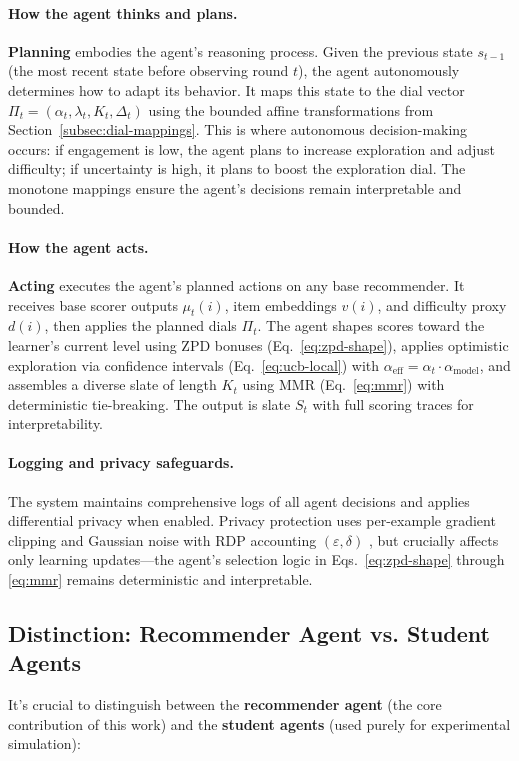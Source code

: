 \paragraph{How the agent thinks and plans.} \textbf{Planning} embodies the agent's reasoning process. Given the previous state \(s_{t-1}\) (the most recent state before observing round \(t\)), the agent autonomously determines how to adapt its behavior. It maps this state to the dial vector \(\Pi_t=(\alpha_t,\lambda_t,K_t,\Delta_t)\) using the bounded affine transformations from Section~\ref{subsec:dial-mappings}. This is where autonomous decision-making occurs: if engagement is low, the agent plans to increase exploration and adjust difficulty; if uncertainty is high, it plans to boost the exploration dial. The monotone mappings ensure the agent's decisions remain interpretable and bounded.

\paragraph{How the agent acts.} \textbf{Acting} executes the agent's planned actions on any base recommender. It receives base scorer outputs \(\mu_t(i)\), item embeddings \(v(i)\), and difficulty proxy \(d(i)\), then applies the planned dials \(\Pi_t\). The agent shapes scores toward the learner's current level using ZPD bonuses (Eq.~\eqref{eq:zpd-shape}), applies optimistic exploration via confidence intervals (Eq.~\eqref{eq:ucb-local}) with \(\alpha_{\mathrm{eff}}=\alpha_t\cdot\alpha_{\text{model}}\), and assembles a diverse slate of length \(K_t\) using MMR (Eq.~\eqref{eq:mmr}) with deterministic tie-breaking. The output is slate \(S_t\) with full scoring traces for interpretability.

\paragraph{Logging and privacy safeguards.} The system maintains comprehensive logs of all agent decisions and applies differential privacy when enabled. Privacy protection uses per-example gradient clipping and Gaussian noise with RDP accounting $(\varepsilon,\delta)$ \cite{Mironov2017RDP,Abadi2016}, but crucially affects only learning updates—the agent's selection logic in Eqs.~\eqref{eq:zpd-shape} through \eqref{eq:mmr} remains deterministic and interpretable.

\subsection{Distinction: Recommender Agent vs. Student Agents}
\label{subsec:arch-distinction-detailed}
It's crucial to distinguish between the \textbf{recommender agent} (the core contribution of this work) and the \textbf{student agents} (used purely for experimental simulation):

